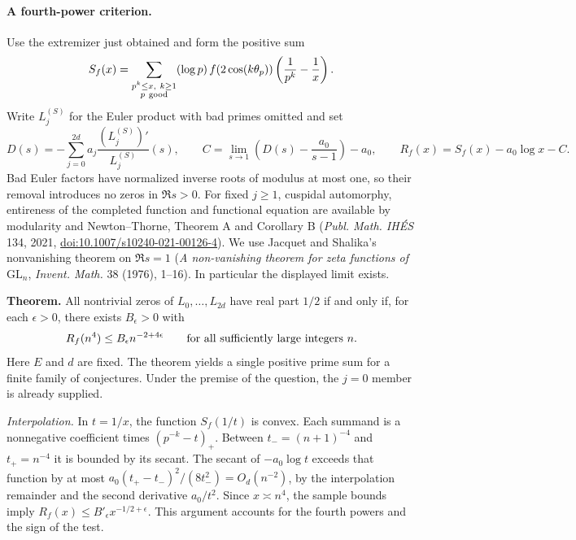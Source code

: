 \paragraph{A fourth-power criterion.}
Use the extremizer just obtained and form the positive sum
\[
 S_f(x)=\sum_{\substack{p^k\le x,\ k\ge1\\p\ {\rm good}}}
 (\log p)\, f(2\cos(k\theta_p))\left(\frac1{p^k}-\frac1x\right).
\]
Write $L_j^{(S)}$ for the Euler product with bad primes omitted and set
\[
 D(s)=-\sum_{j=0}^{2d}a_j\frac{(L_j^{(S)})'}{L_j^{(S)}}(s),\qquad
 C=\lim_{s\to1}\left(D(s)-\frac{a_0}{s-1}\right)-a_0,\qquad
 R_f(x)=S_f(x)-a_0\log x-C .
\]
Bad Euler factors have normalized inverse roots of modulus at most one,
so their removal introduces no zeros in $\Re s>0$. For fixed $j\ge1$,
cuspidal automorphy, entireness of the completed function and functional
equation are available by modularity and Newton--Thorne, Theorem A and
Corollary B (\emph{Publ. Math. IH\'ES} 134, 2021,
\href{https://doi.org/10.1007/s10240-021-00126-4}{doi:10.1007/s10240-021-00126-4}).
We use Jacquet and Shalika's nonvanishing theorem on $\Re s=1$
(\emph{A non-vanishing theorem for zeta functions of $\mathrm{GL}_n$},
\emph{Invent. Math.} 38 (1976), 1--16). In particular the displayed limit exists.

\textbf{Theorem.}
All nontrivial zeros of $L_0,\ldots,L_{2d}$ have real part $1/2$
if and only if, for each $\epsilon>0$, there exists $B_\epsilon>0$ with
\[
 R_f(n^4)\le B_\epsilon n^{-2+4\epsilon}
 \qquad\hbox{for all sufficiently large integers }n.
\]
Here $E$ and $d$ are fixed. The theorem yields a single positive prime
sum for a finite family of conjectures. Under the premise of the question,
the $j=0$ member is already supplied.

\emph{Interpolation.}
In $t=1/x$, the function $S_f(1/t)$ is convex. Each summand is a
nonnegative coefficient times $(p^{-k}-t)_+$. Between
$t_-=(n+1)^{-4}$ and $t_+=n^{-4}$ it is bounded by its secant.
The secant of $-a_0\log t$ exceeds that function by at most
$a_0(t_+-t_-)^2/(8t_-^2)=O_d(n^{-2})$, by the interpolation
remainder and the second derivative $a_0/t^2$. Since $x\asymp n^4$,
the sample bounds imply $R_f(x)\le B'_\epsilon x^{-1/2+\epsilon}$.
This argument accounts for the fourth powers and the sign of the test.

